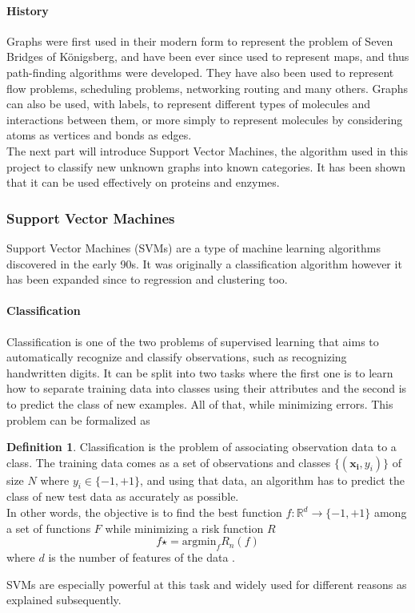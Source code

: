 \documentclass{article}
\let\vec\mathbf
\newcommand*{\R}{%
  \mathbb{R}%
}
\theoremstyle{definition}
\newtheorem{definition}{Definition}
\begin{document}
\paragraph{History} Graphs were first used in their modern form to represent the problem of Seven Bridges of Königsberg, and have been ever since used to represent maps, and thus path-finding algorithms were developed. They have also been used to represent flow problems, scheduling problems, networking routing and many others\cite{bondy1976graph}. Graphs can also be used, with labels, to represent different types of molecules and interactions between them, or more simply to represent molecules by considering atoms as vertices and bonds as edges.\\
The next part will introduce Support Vector Machines, the algorithm used in this project to classify new unknown graphs into known categories. It has been shown\cite{borgwardt_protein_2005} that it can be used effectively on proteins and enzymes.

\subsubsection{Support Vector Machines}
Support Vector Machines (SVMs)\cite{burges_tutorial_1998} are a type of machine learning algorithms discovered in the early 90s\cite{cortes_support-vector_1995}. It was originally a classification algorithm however it has been expanded since to regression and clustering too. 
\paragraph{Classification}
Classification is one of the two problems of supervised learning that aims to automatically recognize and classify observations, such as recognizing handwritten digits. It can be split into two tasks where the first one is to learn how to separate training data into classes using their attributes and the second is to predict the class of new examples. All of that, while minimizing errors. This problem can be formalized as
\begin{definition}
	Classification is the problem of associating observation data to a class. The training data comes as a set of observations and classes $\{(\vec{x_i},y_i)\}$ of size $N$ where $y_i \in \{-1,+1\}$, and using that data, an algorithm has to predict the class of new test data as accurately as possible.\\
	In other words, the objective is to find the best function $f :  \R^d \longrightarrow \{-1,+1\}$ among a set of functions $F$ while minimizing a risk function $R$
	\begin{equation}
		f\star = \mbox{argmin}_f R_{n}(f)
	\end{equation}
	 where $d$ is the number of features of the data .
\end{definition}
SVMs are especially powerful at this task and widely used for different reasons as explained subsequently.
\end{document}
